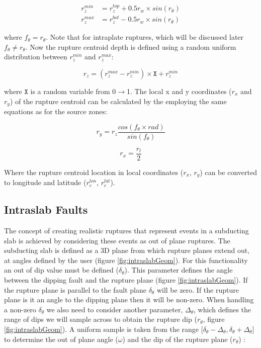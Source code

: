 \begin{subequations} \label{drange}
\begin{align}
r_z^{min} & = r_z^{top} + 0.5r_w  \times sin(r_\theta)    \\
r_z^{max} & = r_z^{bot} - 0.5r_w  \times sin(r_\theta)  
\end{align}
\end{subequations}

where $f_\theta = r_\theta$. Note that for intraplate ruptures, which will be discussed later $f_\theta \ne r_\theta$. 
Now the rupture centroid depth is defined using a random uniform distribution between $r_z^{min}$ and $r_z^{max}$:

\begin{equation} \label{eq:rand}
	r_z = ( r_z^{max}-r_z^{min} ) \times  \mathtt{X} +   r_z^{min}
\end{equation}

where $\mathtt{X}$ is a random variable from 0$\rightarrow$1. The local x and y coordinates ($r_x$ and $r_y$) of the rupture 
centroid can be calculated by the employing the same equations as for the source zones:

\begin{equation}
r_y = r_z  \frac{cos(f_\theta  \times rad)}{sin(f_\theta)}
\end{equation}

\begin{equation}
r_x = \frac{r_l}{2}
\end{equation}

Where the rupture centroid location in local coordinates ($r_x$, $r_y$) can be converted to longitude and latitude ($r_c^{lon}$, $r_c^{lat}$).

\subsection{Intraslab Faults}

The concept of creating realistic ruptures that represent events in a subducting slab is achieved by considering these events as 
out of plane ruptures. The subducting slab is defined as a 3D plane from which rupture planes extend out, at angles defined by
the user (figure \ref{fig:intraslabGeom}). For this functionality an out of dip value must be defined ($\delta_\theta$). 
This parameter defines the angle between the dipping fault and the rupture plane (figure \ref{fig:intraslabGeom}). If the rupture 
plane is parallel to the fault plane $\delta_\theta$ will be zero. If the rupture plane is it an angle to the dipping plane then it 
will be non-zero. When handling a non-zero $\delta_\theta$ we also need to consider another parameter, $\Delta_\theta$, which 
defines the range of dips we will sample across to obtain the rupture dip ($r_\theta$, figure \ref{fig:intraslabGeom}).
A uniform sample is taken from the range [$\delta_\theta - \Delta_\theta, \delta_\theta + \Delta_\theta$] to determine 
the out of plane angle ($\omega$) and the dip of the rupture plane ($r_\theta$) :


